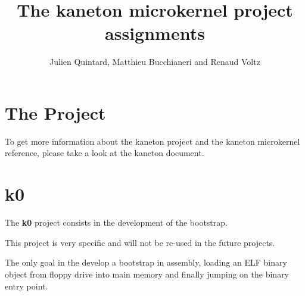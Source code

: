 
%
%



%
%


%
%

\title{The kaneton microkernel project assignments}

%
%

\author{\small{Julien Quintard}, \small{Matthieu Bucchianeri} and \small{Renaud Voltz}}

%
%

\newcommand\prototype[1]{\hspace{1.5cm}#1}

%
%



%
%

\maketitle

%
%

%
%

\section{The Project}

To get more information about the kaneton project and the kaneton
microkernel reference, please take a look at the kaneton document.

%
%

\section{k0}

The \textbf{k0} project consists in the development of the bootstrap.

This project is very specific and will not be re-used in the future
projects.

The only goal in the develop a bootstrap in assembly, loading an ELF
binary object from floppy drive into main memory and finally jumping
on the binary entry point.

